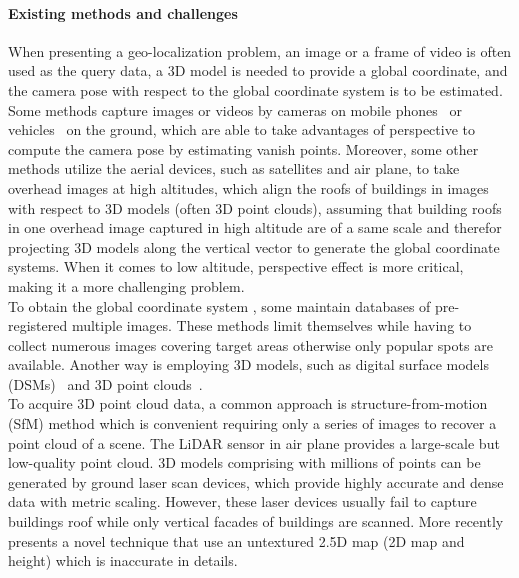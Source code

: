 \paragraph{Existing methods and challenges}
When presenting a geo-localization problem, an image or a frame of video is often used as the query data, a 3D model is needed to provide a global coordinate, and the camera pose with respect to the global coordinate system is to be estimated.
\\
Some methods capture images or videos by cameras on mobile phones~\cite{Arth2015a, instant, Poglitsch2015, Liu2012} or vehicles~\cite{Taneja2015} on the ground, which are able to take advantages of perspective to compute the camera pose by estimating vanish points. %
Moreover, some other methods utilize the aerial devices, such as satellites and air plane, to take overhead images at high altitudes, which align the roofs of buildings in images with respect to 3D models (often 3D point clouds), assuming that building roofs in one overhead image captured in high altitude are of a same scale and therefor projecting 3D models along the vertical vector to generate the global coordinate systems. When it comes to low altitude, perspective effect is more critical, making it a more challenging problem.
\\
To obtain the global coordinate system , some \cite{} maintain databases of pre-registered multiple images. These methods limit themselves while having to collect numerous images covering target areas otherwise only popular spots are available. Another way is employing 3D models, such as digital surface models (DSMs)~\cite{} and 3D point clouds~\cite{}.
\\
To acquire 3D point cloud data, a common approach is structure-from-motion (SfM) method\cite{} which is convenient requiring only a series of images to recover a point cloud of a scene. The LiDAR sensor in air plane provides a large-scale but low-quality point cloud\cite{}. 3D models comprising with millions of points can be generated by ground laser scan devices, which provide highly accurate and dense data with metric scaling. However, these laser devices usually fail to capture buildings roof while only vertical facades of buildings are scanned.
%
More recently \cite{instant} presents a novel technique that use an untextured 2.5D map (2D map and height) which is  inaccurate in details.%
%
